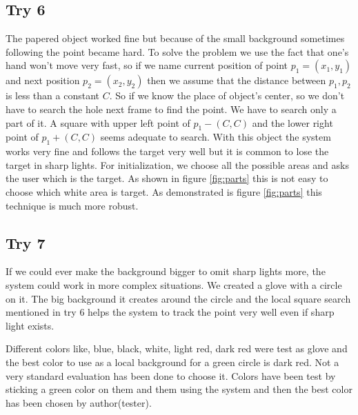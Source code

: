 \subsection{Try 6}
The papered object worked fine but because of the small background sometimes following the point became hard. To solve the problem we use the fact that one's hand won't move very fast, so if we name current position of point $p_1 = (x_1, y_1)$ and next position $p_2 = (x_2, y_2)$ then we assume that the distance between $p_1, p_2$ is less than a constant $C$. So if we know the place of object's center, so we don't have to search the hole next frame to find the point. We have to search only a part of it. A square with upper left point of $p_1 - (C, C)$ and the lower right point of $p_1 + (C, C)$ seems adequate to search. With this object the system works very fine and follows the target very well but it is common to lose the target in sharp lights. \newline
For initialization, we choose all the possible areas and asks the user which is the target. As shown in figure \ref{fig:parts} this is not easy to choose which white area is target. As demonstrated is figure \ref{fig:parts} this technique is much more robust.   
\subsection{Try 7}
If we could ever make the background bigger to omit sharp lights more, the system could work in more complex situations. We created a glove with a circle on it. The big background it creates around the circle and the local square search mentioned in try 6 helps the system to track the point very well even if sharp light exists. 

 Different colors like, blue, black, white, light red, dark red were test as glove and the best color to use as a local background for a green circle is dark red. Not a very standard evaluation has been done to choose it. Colors have been test by sticking a green color on them and them using the system and then the best color has been chosen by author(tester). 

